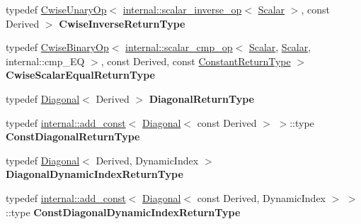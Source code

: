 \begin{DoxyCompactItemize}
typedef \mbox{\hyperlink{class_eigen_1_1_cwise_unary_op}{Cwise\+Unary\+Op}}$<$ \mbox{\hyperlink{struct_eigen_1_1internal_1_1scalar__inverse__op}{internal\+::scalar\+\_\+inverse\+\_\+op}}$<$ \mbox{\hyperlink{class_eigen_1_1_dense_base_a5feed465b3a8e60c47e73ecce83e39a2}{Scalar}} $>$, const Derived $>$ {\bfseries Cwise\+Inverse\+Return\+Type}
\item 
\mbox{\label{class_eigen_1_1_matrix_base_a52cc12982796eeb5a81307829639f832}} 
typedef \mbox{\hyperlink{class_eigen_1_1_cwise_binary_op}{Cwise\+Binary\+Op}}$<$ \mbox{\hyperlink{struct_eigen_1_1internal_1_1scalar__cmp__op}{internal\+::scalar\+\_\+cmp\+\_\+op}}$<$ \mbox{\hyperlink{class_eigen_1_1_dense_base_a5feed465b3a8e60c47e73ecce83e39a2}{Scalar}}, \mbox{\hyperlink{class_eigen_1_1_dense_base_a5feed465b3a8e60c47e73ecce83e39a2}{Scalar}}, internal\+::cmp\+\_\+\+EQ $>$, const Derived, const \mbox{\hyperlink{class_eigen_1_1_cwise_nullary_op}{Constant\+Return\+Type}} $>$ {\bfseries Cwise\+Scalar\+Equal\+Return\+Type}
\item 
\mbox{\label{class_eigen_1_1_matrix_base_af22472a46bb388bc56d9b32593a10111}} 
typedef \mbox{\hyperlink{class_eigen_1_1_diagonal}{Diagonal}}$<$ Derived $>$ {\bfseries Diagonal\+Return\+Type}
\item 
\mbox{\label{class_eigen_1_1_matrix_base_a78aa5c381d44430171b89b65db772c3c}} 
typedef \mbox{\hyperlink{struct_eigen_1_1internal_1_1add__const}{internal\+::add\+\_\+const}}$<$ \mbox{\hyperlink{class_eigen_1_1_diagonal}{Diagonal}}$<$ const Derived $>$ $>$\+::type {\bfseries Const\+Diagonal\+Return\+Type}
\item 
\mbox{\label{class_eigen_1_1_matrix_base_a277030015e39babe7ac5f43326e44820}} 
typedef \mbox{\hyperlink{class_eigen_1_1_diagonal}{Diagonal}}$<$ Derived, Dynamic\+Index $>$ {\bfseries Diagonal\+Dynamic\+Index\+Return\+Type}
\item 
\mbox{\label{class_eigen_1_1_matrix_base_aa9e2489a4b4e41b13d973266631a0dee}} 
typedef \mbox{\hyperlink{struct_eigen_1_1internal_1_1add__const}{internal\+::add\+\_\+const}}$<$ \mbox{\hyperlink{class_eigen_1_1_diagonal}{Diagonal}}$<$ const Derived, Dynamic\+Index $>$ $>$\+::type {\bfseries Const\+Diagonal\+Dynamic\+Index\+Return\+Type}

\end{DoxyCompactItemize}

